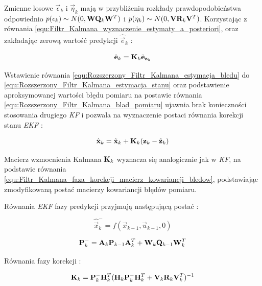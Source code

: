Zmienne losowe $\vec{\epsilon}_k$ i $\vec{\eta}_k$ mają w przybliżeniu rozkłady prawdopodobieństwa odpowiednio $p(\mathbf{\epsilon}_k) \sim N(0, \mathbf{W}\mathbf{Q}_k\mathbf{W}^T)$ i $p(\mathbf{\eta}_k) \sim N(0, \mathbf{V}\mathbf{R}_k\mathbf{V}^T)$. Korzystając z równania \ref{equ:Filtr_Kalmana_wyznaczenie_estymaty_a_posteriori}, oraz zakładając zerową wartość predykcji $\hat{\vec{e}}_k$ \cite{Welch1995}:

\begin{equation}
\label{equ:Rozszerzony_Filtr_Kalmana_estymacja_bledu}
	\hat{\vec{e}}_k = \matr{K}_k \tilde{\vec{e}}_{\vec{z}_k}
\end{equation}

Wstawienie równania \ref{equ:Rozszerzony_Filtr_Kalmana_estymacja_bledu} do \ref{equ:Rozszerzony_Filtr_Kalmana_estymacja_stanu} oraz podstawienie aproksymowanej wartości błędu pomiaru na postawie równania \ref{equ:Rozszerzony_Filtr_Kalmana_blad_pomiaru} ujawnia brak konieczności stosowania drugiego \textit{KF} i pozwala na wyznaczenie postaci równania korekcji stanu \textit{EKF} \cite{Welch1995}:

\begin{equation}
\label{equ:Rozszerzony_Filtr_Kalmana_estymacja_stanu_cd}
	\hat{\vec{x}}_k = \tilde{\vec{x}}_k + \matr{K}_k (\vec{z}_k - \tilde{\vec{z}}_k)
\end{equation}

Macierz wzmocnienia Kalmana $\mathbf{K}_k$ wyznacza się analogicznie jak w \textit{KF}, na podstawie równania \ref{equ:Filtr_Kalmana_faza_korekcji_macierz_kowariancji_bledow}, podstawiając zmodyfikowaną postać macierzy kowariancji błędów pomiaru.

Równania \textit{EKF} fazy predykcji przyjmują następującą postać \cite{Welch1995}:

\begin{equation}
\label{equ:Rozszerzony_Filtr_Kalmana_faza_predykcji_stan}
	\hat{\vec{x}}_k^- = f(\vec{x}_{k-1}, \vec{u}_{k-1}, 0)
\end{equation}

\begin{equation}
\label{equ:Rozszerzony_Filtr_Kalmana_faza_predykcji_macierz_kowariancji_bledow}
	\mathbf{P}_k^- = \mathbf{A}_k \mathbf{P}_{k-1} \mathbf{A}_k^T + \mathbf{W}_k\mathbf{Q}_{k-1}\mathbf{W}_k^T
\end{equation}

Równania fazy korekcji \cite{Welch1995}:

\begin{equation}
\label{equ:Rozszerzony_Filtr_Kalmana_faza_korekcji_wzmocnienie}
	\mathbf{K}_k = \mathbf{P}_k^- \mathbf{H}_k^T ( \mathbf{H}_k \mathbf{P}_k^- \mathbf{H}_k^T + \mathbf{V}_k\mathbf{R}_k\mathbf{V}_k^T ) ^ {-1}
\end{equation}

